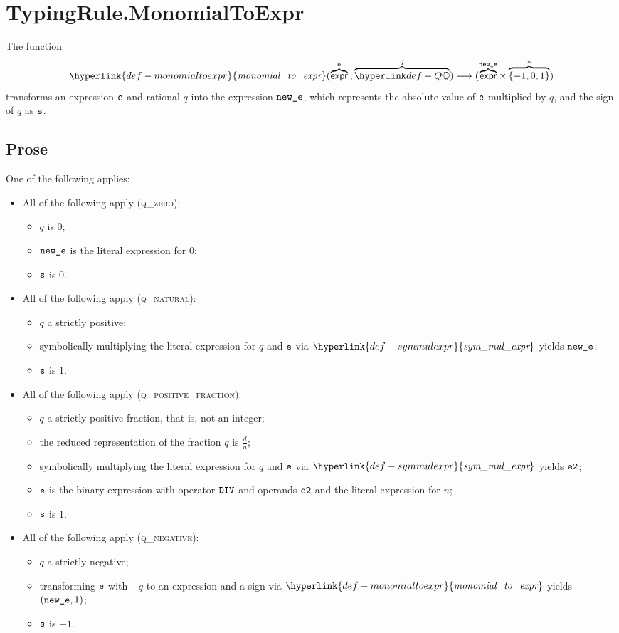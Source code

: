 \documentclass{book}
\newcommand\monomialtoexpr[0]{\hyperlink{def-monomialtoexpr}{\textfunc{monomial\_to\_expr}}}
\newcommand\symmulexpr[0]{\hyperlink{def-symmulexpr}{\textfunc{sym\_mul\_expr}}}
\begin{document}
\section{TypingRule.MonomialToExpr \label{sec:TypingRule.MonomialToExpr}}
\hypertarget{def-monomialtoexpr}{}
The function
\[
\monomialtoexpr(\overname{\expr}{\ve} \aslsep \overname{\Q}{q})
\aslto (\overname{\expr}{\newe} \times \overname{\{-1,0,1\}}{\vs})
\]
transforms an expression $\texttt{e}$ and rational $q$ into the expression $\texttt{new\_e}$,
which represents the absolute value of $\texttt{e}$ multiplied by $q$, and the sign of $q$ as $\texttt{s}$.

\subsection{Prose}
One of the following applies:
\begin{itemize}
  \item All of the following apply (\textsc{q\_zero}):
  \begin{itemize}
    \item $q$ is $0$;
    \item $\texttt{new\_e}$ is the literal expression for $0$;
    \item $\texttt{s}$ is $0$.
  \end{itemize}

  \item All of the following apply (\textsc{q\_natural}):
  \begin{itemize}
    \item $q$ a strictly positive;
    \item symbolically multiplying the literal expression for $q$ and $\texttt{e}$ via $\symmulexpr$ yields $\texttt{new\_e}$;
    \item $\texttt{s}$ is $1$.
  \end{itemize}

  \item All of the following apply (\textsc{q\_positive\_fraction}):
  \begin{itemize}
    \item $q$ a strictly positive fraction, that is, not an integer;
    \item the reduced representation of the fraction $q$ is $\frac{d}{n}$;
    \item symbolically multiplying the literal expression for $q$ and $\texttt{e}$ via $\symmulexpr$ yields $\texttt{e2}$;
    \item $\texttt{e}$ is the binary expression with operator $\texttt{DIV}$ and operands $\texttt{e2}$ and the literal expression for $n$;
    \item $\texttt{s}$ is $1$.
  \end{itemize}

  \item All of the following apply (\textsc{q\_negative}):
  \begin{itemize}
    \item $q$ a strictly negative;
    \item transforming $\texttt{e}$ with $-q$ to an expression and a sign via $\monomialtoexpr$ yields $(\texttt{new\_e}, 1)$;
    \item $\texttt{s}$ is $-1$.
  \end{itemize}
\end{itemize}
\end{document}
